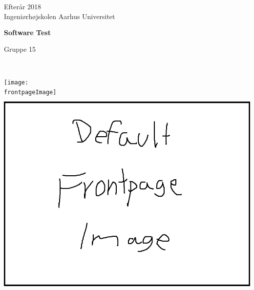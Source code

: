 \begin{center}
	{\fontsize{12pt}{0}\selectfont
		Efterår 2018\\
	}
		\vspace{5pt}
	{\fontsize{12pt}{0}\selectfont
		Ingeniørhøjskolen Aarhus Universitet\\
	}

	\vspace{25pt}
	
	{\fontsize{42pt}{0}\selectfont
		\textbf{Software Test\\}
	}
	\vspace{5pt}
	
	{\fontsize{28pt}{0}\selectfont
		Gruppe 15\\
	}
	\vspace{25pt}
	

	{\fontsize{28pt}{0}\selectfont
        \textbf{\thetitle\\}
	}
	\vspace{20pt}

	\ifdefined\frontpageImage
		\texttt{[image: \\frontpageImage]}
	\else
		\includegraphics[width=\linewidth,height=300pt,keepaspectratio]{defaultfrontpageimage.png}
	\fi
	\vspace*{\fill}


\end{center}
